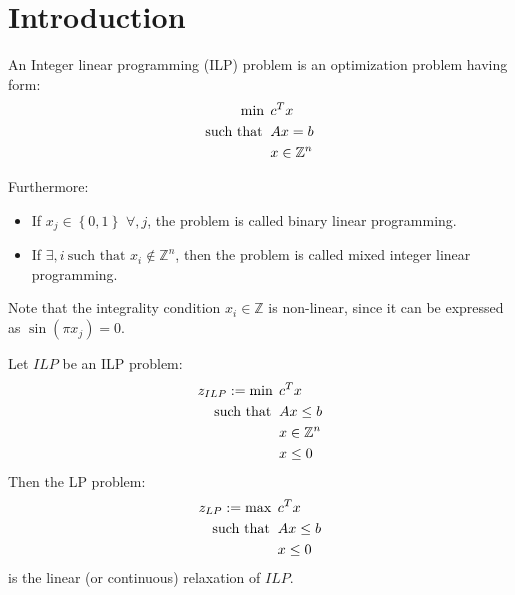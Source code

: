 \section{Introduction}

\begin{definition}
    An Integer linear programming (ILP) problem is an optimization problem having form:
    \begin{align*}
        \min                      \:&\: c^Tx           \\
        \textnormal{such that }     &\: Ax = b         \\
                                    &\: x \in \mathbb{Z}^n
    \end{align*}  
\end{definition}
Furthermore:
\begin{itemize}
  \item If $x_j \in \left\{ 0, 1 \right\}$ $\forall, j$, the  problem is called binary linear programming.
  \item If $\exists, i \ \text{such that}$ $x_i \notin \mathbb{Z}^n$, then the problem is called mixed integer linear programming.
\end{itemize}
Note that the integrality condition $x_i \in \mathbb{Z}$ is non-linear, since it can be expressed as $\sin(\pi x_j) = 0$.
  
\begin{definition}
    Let $ILP$ be an ILP problem:
    \begin{align*}
        z_{ILP}:=\min                      \:&\: c^Tx           \\
        \textnormal{such that }     &\: Ax \leq b               \\
                                    &\: x \in \mathbb{Z}^n      \\
                                    &\: x \leq 0
    \end{align*}  
    Then the LP problem:
    \begin{align*}
        z_{LP}:=\max                      \:&\: c^Tx                    \\
        \textnormal{such that }             &\: Ax \leq b               \\
                                            &\: x \leq 0
    \end{align*}  
    is the linear (or continuous) relaxation of $ILP$.
\end{definition}

